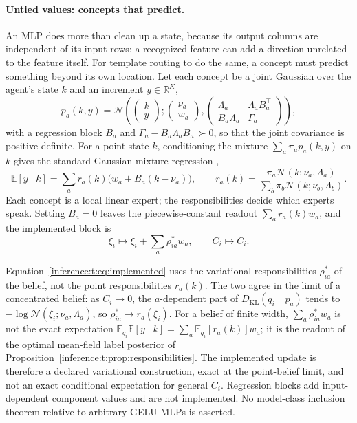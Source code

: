 \documentclass[11pt]{article}
\theoremstyle{definition}
\theoremstyle{remark}
\providecommand{\KL}{D_{\mathrm{KL}}}
\providecommand{\E}{\mathbb{E}}
\providecommand{\N}{\mathcal{N}}
\begin{document}
\paragraph{Untied values: concepts that predict.}
An MLP does more than clean up a state, because its output columns are independent of its input rows: a recognized feature can add a direction unrelated to the feature itself. For template routing to do the same, a concept must predict something beyond its own location. Let each concept be a joint Gaussian over the agent's state $k$ and an increment $y\in\mathbb{R}^K$,
\begin{equation}
p_a(k,y)=\N\left(\begin{pmatrix}k\\ y\end{pmatrix};\begin{pmatrix}\nu_a\\ w_a\end{pmatrix},\begin{pmatrix}\Lambda_a&\Lambda_aB_a^{\top}\\ B_a\Lambda_a&\Gamma_a\end{pmatrix}\right),
\end{equation}
with a regression block $B_a$ and $\Gamma_a-B_a\Lambda_aB_a^{\top}\succ0$, so that the joint covariance is positive definite. For a point state $k$, conditioning the mixture $\sum_a\pi_ap_a(k,y)$ on $k$ gives the standard Gaussian mixture regression \citep{inference:ghahramani1994,inference:jacobs1991},
\begin{equation}
\E[y\mid k]=\sum_ar_a(k)\bigl(w_a+B_a(k-\nu_a)\bigr),
\qquad
r_a(k)=\frac{\pi_a\N(k;\nu_a,\Lambda_a)}{\sum_b\pi_b\N(k;\nu_b,\Lambda_b)}.
\label{inference:t:eq:gmr}
\end{equation}
Each concept is a local linear expert; the responsibilities decide which experts speak. Setting $B_a=0$ leaves the piecewise-constant readout $\sum_ar_a(k)w_a$, and the implemented block is
\begin{equation}
\xi_i\mapsto\xi_i+\sum_a\rho^{*}_{ia}w_a,
\qquad
C_i\mapsto C_i.
\label{inference:t:eq:implemented}
\end{equation}

Equation~\eqref{inference:t:eq:implemented} uses the variational responsibilities $\rho^{*}_{ia}$ of the belief, not the point responsibilities $r_a(k)$. The two agree in the limit of a concentrated belief: as $C_i\to0$, the $a$-dependent part of $\KL(q_i\|p_a)$ tends to $-\log\N(\xi_i;\nu_a,\Lambda_a)$, so $\rho^{*}_{ia}\to r_a(\xi_i)$. For a belief of finite width, $\sum_a\rho^{*}_{ia}w_a$ is not the exact expectation $\E_{q_i}\E[y\mid k]=\sum_a\E_{q_i}[r_a(k)]w_a$; it is the readout of the optimal mean-field label posterior of Proposition~\ref{inference:t:prop:responsibilities}. The implemented update is therefore a declared variational construction, exact at the point-belief limit, and not an exact conditional expectation for general $C_i$. Regression blocks add input-dependent component values and are not implemented. No model-class inclusion theorem relative to arbitrary GELU MLPs is asserted.
\end{document}
